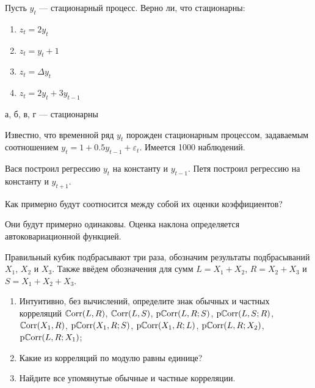 
\begin{problem}
Пусть $y_{t}$ — стационарный процесс. Верно ли, что стационарны:
\begin{enumerate}
\item $z_{t}=2y_{t}$
\item $z_{t}=y_{t}+1$
\item $z_{t}=\Delta y_{t}$
\item $z_{t}=2y_{t}+3y_{t-1}$
\end{enumerate}
\begin{sol}
а, б, в, г — стационарны
\end{sol}
\end{problem}





\begin{problem}
Известно, что временной ряд $y_{t}$ порожден стационарным процессом, задаваемым соотношением $y_{t}=1+0.5y_{t-1}+\varepsilon_{t}$. Имеется 1000 наблюдений.


Вася построил регрессию $y_{t}$ на константу и $y_{t-1}$. Петя построил регрессию на константу и $y_{t+1}$.


Как примерно будут соотносится между собой их оценки коэффициентов?
\begin{sol}
Они будут примерно одинаковы. Оценка наклона определяется автоковариационной функцией.
\end{sol}
\end{problem}


\begin{problem}
Правильный кубик подбрасывают три раза, обозначим результаты подбрасываний $X_1$, $X_2$ и $X_3$. Также ввёдем обозначения для сумм $L=X_1+X_2$, $R=X_2+X_3$ и $S=X_1+X_2+X_3$.
\begin{enumerate}
\item Интуитивно, без вычислений, определите знак обычных и частных корреляций $\operatorname{\mathbb{C}\mathrm{orr}}(L, R)$, $\operatorname{\mathbb{C}\mathrm{orr}}(L, S)$, $\operatorname{\mathrm{p}\mathbb{C}\mathrm{orr}}(L, R; S)$,
  $\operatorname{\mathrm{p}\mathbb{C}\mathrm{orr}}(L, S; R)$, $\operatorname{\mathbb{C}\mathrm{orr}}(X_1, R)$, $\operatorname{\mathrm{p}\mathbb{C}\mathrm{orr}}(X_1, R; S)$, $\operatorname{\mathrm{p}\mathbb{C}\mathrm{orr}}(X_1, R; L)$, $\operatorname{\mathrm{p}\mathbb{C}\mathrm{orr}}(L, R; X_2)$, $\operatorname{\mathrm{p}\mathbb{C}\mathrm{orr}}(L, R; X_1)$;
\item Какие из корреляций по модулю равны единице?
\item Найдите все упомянутые обычные и частные корреляции.
\end{enumerate}
\begin{sol}

\end{sol}
\end{problem}


